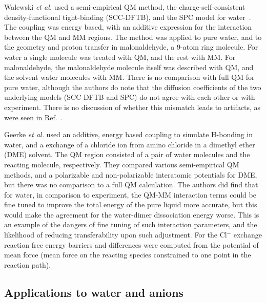 \documentclass[11pt]{revtex4}
\begin{document}
Walewski {\it et al.} used a semi-empirical QM method, the
charge-self-consistent density-functional tight-binding (SCC-DFTB),
and the SPC model for water~\cite{walewski_chem_phys_lett_2004a}.
The coupling was energy based, with an additive expression for the
interaction between the QM and MM regions.  The method was applied
to pure water, and to the geometry and proton transfer in malonaldehyde,
a 9-atom ring molecule.  For water a single molecule was treated
with QM, and the rest with MM.  For malonaldehyde, the malonaldehyde
molecule itself was described with QM, and the solvent water molecules
with MM.  There is no comparison with full QM for pure water,
although the authors do note that the diffusion coefficients of the
two underlying models (SCC-DFTB and SPC) do not agree with each
other or with experiment.  There is no discussion of whether this
mismatch leads to artifacts, as were seen in
Ref.~.

Geerke {\it et al.} used an additive, energy based coupling to
simulate H-bonding in water, and a exchange of a chloride ion from
amino chloride in a dimethyl ether (DME) solvent.  The QM region
consisted of a pair of water molecules and the reacting molecule,
respectively.  They compared various semi-empirical QM methods, and
a polarizable and non-polarizable interatomic potentials for DME,
but there was no comparison to a full QM calculation.  The authors
did find that for water, in comparison to experiment, the QM-MM
interaction terms could be fine tuned to improve the total energy
of the pure liquid more accurate, but this would make the agreement
for the water-dimer dissociation energy worse.  This is an example
of the dangers of fine tuning of such interaction parameters, and
the likelihood of reducing transferability upon such adjustment.
For the Cl$^-$ exchange reaction free energy barriers and differences
were computed from the potential of mean force (mean force on the
reacting species constrained to one point in the reaction path).

\subsection{Applications to water and anions}
\end{document}
